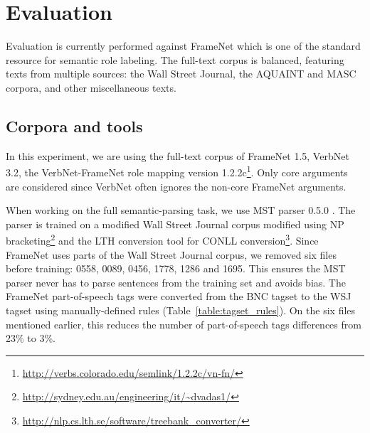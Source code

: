\section{Evaluation}

Evaluation is currently performed against FrameNet which is one of the standard
resource for semantic role labeling. The full-text corpus is balanced,
featuring texts from multiple sources: the Wall Street Journal, the AQUAINT and
MASC corpora, and other miscellaneous texts.

\subsection{Corpora and tools}

In this experiment, we are using the full-text corpus of FrameNet 1.5, VerbNet
3.2, the VerbNet-FrameNet role mapping version
1.2.2c\footnote{\url{http://verbs.colorado.edu/semlink/1.2.2c/vn-fn/}}. Only
core arguments are considered since VerbNet often ignores the non-core FrameNet
arguments.

When working on the full semantic-parsing task, we use MST parser 0.5.0
\citep{mcdonald2006multilingual}. The parser is trained on a modified Wall
Street Journal corpus modified using NP
bracketing\footnote{\url{http://sydney.edu.au/engineering/it/~dvadas1/}} and
the LTH conversion tool for CONLL
conversion\footnote{\url{http://nlp.cs.lth.se/software/treebank_converter/}}.
Since FrameNet uses parts of the Wall Street Journal corpus, we removed six
files before training: 0558, 0089, 0456, 1778, 1286 and 1695. This ensures the
MST parser never has to parse sentences from the training set and avoids bias.
The FrameNet part-of-speech tags were converted from the BNC tagset to the WSJ
tagset using manually-defined rules (Table~\ref{table:tagset_rules}). On the
six files mentioned earlier, this reduces the number of part-of-speech tags
differences from 23\% to 3\%.

